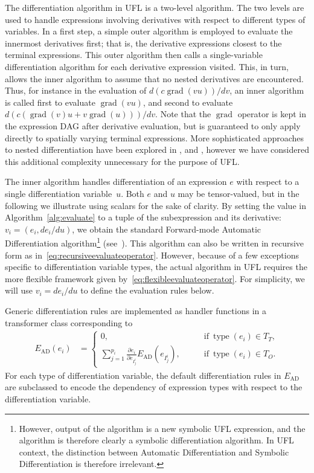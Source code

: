 \documentclass[prodmode,acmtoms]{acmsmall}
\DeclareMathOperator{\Grad}{grad}
\newcommand{\type}{\operatorname{type}}
\begin{document}
The differentiation algorithm in UFL is a two-level algorithm. The
two levels are used to handle expressions involving derivatives with
respect to different types of variables. In a first step, a simple outer
algorithm is employed to evaluate the innermost derivatives first; that
is, the derivative expressions closest to the terminal expressions. This
outer algorithm then calls a single-variable differentiation algorithm
for each derivative expression visited. This, in turn, allows the inner
algorithm to assume that no nested derivatives are encountered. Thus,
for instance in the evaluation of $d(c \Grad(v u)) / dv$,
an inner algorithm is called first to evaluate $\Grad(v u)$, and second
to evaluate $d(c (\Grad(v) u + v \Grad(u))) / dv$. Note
that the $\Grad$ operator is kept in the expression DAG after derivative
evaluation, but is guaranteed to only apply directly to spatially
varying terminal expressions.  More sophisticated approaches to
nested differentiation have been explored in \citet{Karczmarczuk2001},
\citet{PearlmutterSiskind2007} and \citet{SiskindPearlmutter2008},
however we have considered this additional complexity unnecessary for
the purpose of UFL.

The inner algorithm handles differentiation of an expression $e$ with
respect to a single differentiation variable~$u$. Both $e$ and $u$ may
be tensor-valued, but in the following we illustrate using scalars for
the sake of clarity. By setting the value in
Algorithm~\ref{alg:evaluate} to a tuple of the subexpression and its
derivative: $v_i = (e_i, de_i/du)$, we obtain the standard Forward-mode
Automatic Differentiation algorithm\footnote{However, output of
  the algorithm is a new symbolic UFL expression, and the algorithm is
  therefore clearly a symbolic differentiation algorithm. In UFL
  context, the distinction between Automatic Differentiation and
  Symbolic Differentiation is therefore irrelevant.}
(see~\citep{Griewank1989}).
This algorithm can also be written in recursive form as
in~\eqref{eq:recursiveevaluateoperator}.  However, because of a few
exceptions specific to differentiation variable types, the actual
algorithm in UFL requires the more flexible framework given
by~\eqref{eq:flexibleevaluateoperator}. For simplicity, we will use
$v_i = de_i/du$ to define the evaluation rules below.

Generic differentiation rules are implemented as handler functions in
a transformer class corresponding to
\begin{align}
E_{\mathrm{AD}}(e_i) & =
\begin{cases}
0,
  \qquad & \text{if} \ \type(e_i) \in T_T, \\
\sum_{j=1}^{p_i} \frac{\partial e_i}{\partial e_{I_j^i}} E_{\mathrm{AD}}(e_{I_j^i}),
  \qquad & \text{if} \ \type(e_i) \in T_O.
\end{cases}
\end{align}
For each type of differentiation variable, the default differentiation
rules in $E_{\mathrm{AD}}$ are subclassed to encode the dependency of
expression types with respect to the differentiation variable.
\end{document}
